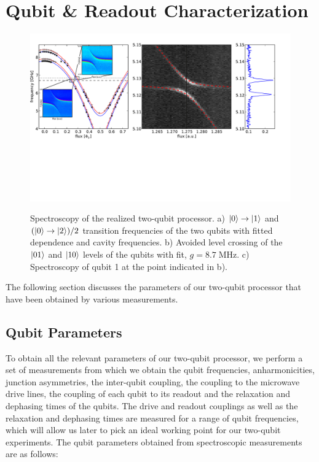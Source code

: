 \section{Qubit \& Readout Characterization}

\begin{figure}[ht!]
	\centering
		\includegraphics[width=1.\textwidth]{"./data/ct5/2011_04_11 - anticrossing/processor_spectroscopy"}
	\label{fig:ProcessorSpectroscopy}
	\caption[Spectroscopy of the Two-Qubit Processor]{Spectroscopy of the realized two-qubit processor. a) $\left| 0 \right>\to\left| 1 \right>$ and $(\left| 0 \right>\to\left| 2 \right>)/2$ transition frequencies of the two qubits with fitted dependence and cavity frequencies. b) Avoided level crossing of the $\left| 01 \right>$ and $\left| 10 \right>$ levels of the qubits with fit, $g = 8.7 \; \mathrm{MHz}$. c) Spectroscopy of qubit 1 at the point indicated in b).}
\end{figure}

The following section discusses the parameters of our two-qubit processor that have been obtained by various measurements.

\subsection{Qubit Parameters}

To obtain all the relevant parameters of our two-qubit processor, we perform a set of measurements from which we obtain the qubit frequencies, anharmonicities, junction asymmetries, the inter-qubit coupling, the coupling to the microwave drive lines, the coupling of each qubit to its readout and the relaxation and dephasing times of the qubits. The drive and readout couplings as well as the relaxation and dephasing times are measured for a range of qubit frequencies, which will allow us later to pick an ideal working point for our two-qubit experiments. The qubit parameters obtained from spectroscopic measurements are as follows:

